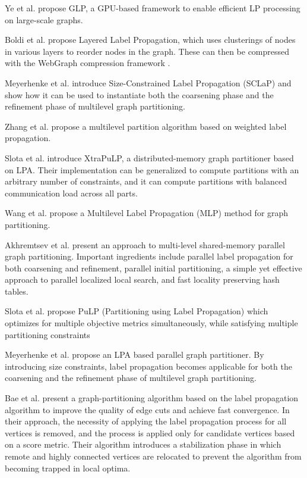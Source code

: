 {Ye et al. \cite{ye2023large} propose GLP, a GPU-based framework to enable efficient LP processing on large-scale graphs.

Boldi et al. \cite{boldi2011layered} propose Layered Label Propagation, which uses clusterings of nodes in various layers to reorder nodes in the graph. These can then be compressed with the WebGraph compression framework \cite{boldi2004webgraph}.

Meyerhenke et al. \cite{meyerhenke2016partitioning} introduce Size-Constrained Label Propagation (SCLaP) and show how it can be used to instantiate both the coarsening phase and the refinement phase of multilevel graph partitioning.

Zhang et al. \cite{zhang2020multilevel} propose a multilevel partition algorithm based on weighted label propagation.

Slota et al. \cite{slota2020scalable} introduce XtraPuLP, a distributed-memory graph partitioner based on LPA. Their implementation can be generalized to compute partitions with an arbitrary number of constraints, and it can compute partitions with balanced communication load across all parts.

Wang et al. \cite{wang2014partition} propose a Multilevel Label Propagation (MLP) method for graph partitioning.

Akhremtsev et al. \cite{akhremtsev2020high} present an approach to multi-level shared-memory parallel graph partitioning. Important ingredients include parallel label propagation for both coarsening and refinement, parallel initial partitioning, a simple yet effective approach to parallel localized local search, and fast locality preserving hash tables.

Slota et al. \cite{slota2014pulp} propose PuLP (Partitioning using Label Propagation) which optimizes for multiple objective metrics simultaneously, while satisfying multiple partitioning constraints

Meyerhenke et al. \cite{meyerhenke2017parallel} propose an LPA based parallel graph partitioner. By introducing size constraints, label propagation becomes applicable for both the coarsening and the refinement phase of multilevel graph partitioning.

Bae et al. \cite{bae2020label} present a graph-partitioning algorithm based on the label propagation algorithm to improve the quality of edge cuts and achieve fast convergence. In their approach, the necessity of applying the label propagation process for all vertices is removed, and the process is applied only for candidate vertices based on a score metric. Their algorithm introduces a stabilization phase in which remote and highly connected vertices are relocated to prevent the algorithm from becoming trapped in local optima.

}
